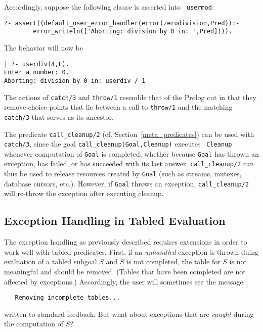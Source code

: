 Accordingly, suppose the following clause is asserted into {\tt
usermod}:
%
\begin{small}
\begin{verbatim}
?- assert((default_user_error_handler(error(zerodivision,Pred)):- 
        error_writeln(['Aborting: division by 0 in: ',Pred]))).
\end{verbatim}
\end{small}
%
The behavior will now be
\begin{small}
\begin{verbatim}
| ?- userdiv(4,F).
Enter a number: 0.
Aborting: division by 0 in: userdiv / 1
\end{verbatim}
\end{small}
The actions of {\tt catch/3} and {\tt throw/1} resemble that of the
Prolog cut in that they remove choice points that lie between a call
to {\tt throw/1} and the matching {\tt catch/3} that serves as its
ancestor. 


The predicate {\tt call\_cleanup/2}
(cf. Section~\ref{meta_predicates}) can be used with {\tt catch/3},
since the goal {\tt call\_cleanup(Goal,Cleanup)} executes {\tt
  Cleanup} whenever computation of {\tt Goal} is completed, whether
because {\tt Goal} has thrown an exception, has failed, or has
succeeded with its last answer.  {\tt call\_cleanup/2} can thus be
used to release resources created by {\tt Goal} (such as streams,
mutexes, database cursors, etc.).  However, if {\tt Goal} throws an
exception, {\tt call\_cleanup/2} will re-throw the exception after
executing cleanup.

\subsection{Exception Handling in Tabled Evaluation}
%
The exception handling as previously described requires extensions in
order to work well with tabled predicates.  First, if an {\em
  unhandled} exception is thrown duing evaluation of a tabled subgoal
$S$ and $S$ is not completed, the table for $S$ is not meaningful and
should be removed.  (Tables that have been completed are not affected
by exceptions.)  Accordingly, the user will sometimes see the message:
%
\begin{verbatim}
   Removing incomplete tables...
\end{verbatim}
%
written to standard feedback.  But what about exceptions that are {\em
  caught} during the computation of $S$?

